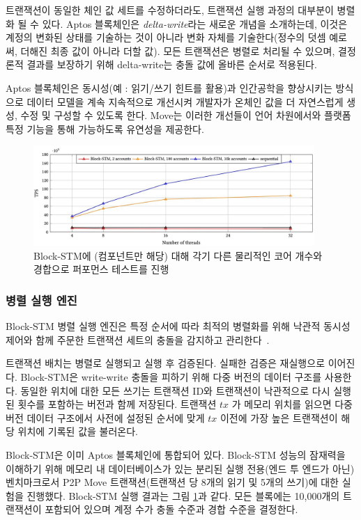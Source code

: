\documentclass{article}
\begin{document}
트랜잭션이 동일한 체인 값 세트를 수정하더라도, 트랜잭션 실행 과정의 대부분이 병렬화 될 수 있다. Aptos 블록체인은 \emph{delta-write}라는 새로운 개념을 소개하는데, 이것은 계정의 변화된 상태를 기술하는 것이 아니라 변화 자체를 기술한다(정수의 덧셈 예로써, 더해진 최종 값이 아니라 더할 값). 모든 트랜잭션은 병렬로 처리될 수 있으며, 결정론적 결과를 보장하기 위해 delta-write는 충돌 값에 올바른 순서로 적용된다.

Aptos 블록체인은 동시성(예 : 읽기/쓰기 힌트를 활용)과 인간공학을 향상시키는 방식으로 데이터 모델을 계속 지속적으로 개선시켜 개발자가 온체인 값을 더 자연스럽게 생성, 수정 및 구성할 수 있도록 한다. Move는 이러한 개선들이 언어 차원에서와 플랫폼 특정 기능을 통해 가능하도록 유연성을 제공한다.


\begin{figure}
\centering
\includegraphics[width=0.95\textwidth]{perf.jpg}
\caption{\label{fig:perf}Block-STM에 (컴포넌트만 해당) 대해 각기 다른 물리적인 코어 개수와 경합으로 퍼포먼스 테스트를 진행}
\end{figure}

\subsubsection{병렬 실행 엔진}

Block-STM 병렬 실행 엔진은 특정 순서에 따라 최적의 병렬화를 위해 낙관적 동시성 제어와 함께 주문한 트랜잭션 세트의 충돌을 감지하고 관리한다~\cite{block_stm}.

트랜잭션 배치는 병렬로 실행되고 실행 후 검증된다. 실패한 검증은 재실행으로 이어진다. Block-STM은 write-write 충돌을 피하기 위해 다중 버전의 데이터 구조를 사용한다. 동일한 위치에 대한 모든 쓰기는 트랜잭션 ID와 트랜잭션이 낙관적으로 다시 실행된 횟수를 포함하는 버전과 함께 저장된다. 트랜잭션 $tx$ 가 메모리 위치를 읽으면 다중 버전 데이터 구조에서 사전에 설정된 순서에 맞게 $tx$ 이전에 가장 높은 트랜잭션이 해당 위치에 기록된 값을 불러온다.

Block-STM은 이미 Aptos 블록체인에 통합되어 있다. Block-STM 성능의 잠재력을 이해하기 위해 메모리 내 데이터베이스가 있는 분리된 실행 전용(엔드 투 엔드가 아닌) 벤치마크로서 P2P Move 트랜잭션(트랜잭션 당 8개의 읽기 및 5개의 쓰기)에 대한 실험을 진행했다. Block-STM 실행 결과는 그림 \ref{fig:perf}과 같다. 모든 블록에는 10,000개의 트랜잭션이 포함되어 있으며 계정 수가 충돌 수준과 경합 수준을 결정한다.
\end{document}
